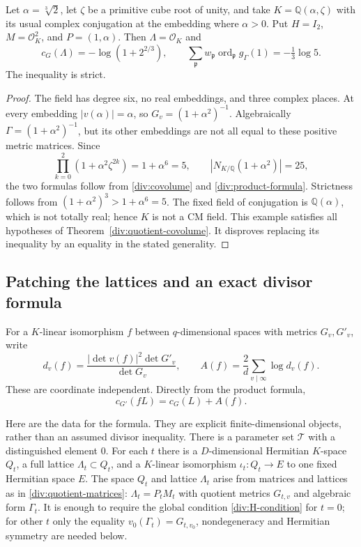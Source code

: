 \begin{example}\label{div:strict}
Let $\alpha=\sqrt[3]{2}$, let $\zeta$ be a primitive cube root of unity,
and take $K=\mathbb Q(\alpha,\zeta)$ with its usual complex conjugation
at the embedding where $\alpha>0$. Put $H=I_2$, $M=\mathcal O_K^2$,
and $P=(1,\alpha)$. Then $\Lambda=\mathcal O_K$ and
\[
 c_G(\Lambda)=-\log(1+2^{2/3}),\qquad
 \sum_{\mathfrak p}w_{\mathfrak p}
       \operatorname{ord}_{\mathfrak p}g_\Gamma(1)
       =-\tfrac13\log5.
\]
The inequality is strict.
\end{example}
\begin{proof}
The field has degree six, no real embeddings, and three complex places.
At every embedding $|v(\alpha)|=\alpha$, so
$G_v=(1+\alpha^2)^{-1}$. Algebraically
$\Gamma=(1+\alpha^2)^{-1}$, but its other embeddings are not all equal
to these positive metric matrices. Since
\[
 \prod_{k=0}^2(1+\alpha^2\zeta^{2k})=1+\alpha^6=5,
 \qquad |N_{K/\mathbb Q}(1+\alpha^2)|=25,
\]
the two formulas follow from \eqref{div:covolume} and
\eqref{div:product-formula}. Strictness follows from
$(1+\alpha^2)^3>1+\alpha^6=5$.
The fixed field of conjugation is $\mathbb Q(\alpha)$, which is not
totally real; hence $K$ is not a CM field. This example satisfies all
hypotheses of Theorem~\ref{div:quotient-covolume}. It disproves replacing
its inequality by an equality in the stated generality.
\end{proof}

\subsection{Patching the lattices and an exact divisor formula}

For a $K$-linear isomorphism $f$ between $q$-dimensional spaces with
metrics $G_v,G'_v$, write
\[
 d_v(f)=\frac{|\det v(f)|^2\det G'_v}{\det G_v},\qquad
 A(f)=\frac2d\sum_{v\mid\infty}\log d_v(f).
\]
These are coordinate independent. Directly from the product formula,
\begin{equation}\label{div:image-covolume}
 c_{G'}(fL)=c_G(L)+A(f).
\end{equation}

Here are the data for the formula. They are explicit finite-dimensional
objects, rather than an assumed divisor inequality.
There is a parameter set $\mathcal T$ with a distinguished element $0$.
For each $t$ there is a $D$-dimensional Hermitian $K$-space $Q_t$, a full
lattice $\Lambda_t\subset Q_t$, and a $K$-linear isomorphism
$\iota_t:Q_t\to E$ to one fixed Hermitian space $E$.
The space $Q_t$ and lattice $\Lambda_t$ arise from matrices and lattices
as in \eqref{div:quotient-matrices}: $\Lambda_t=P_tM_t$ with quotient
metrics $G_{t,v}$ and algebraic form $\Gamma_t$.
It is enough to require the global condition
\eqref{div:H-condition} for $t=0$; for other $t$ only the equality
$v_0(\Gamma_t)=G_{t,v_0}$, nondegeneracy and Hermitian symmetry are
needed below.

